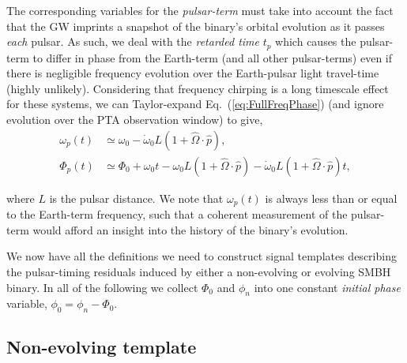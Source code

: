 \documentclass[twocolappendix,tighten]{emulateapj}
\begin{document}
The corresponding variables for the {\it pulsar-term} must take into account the fact that the GW imprints a snapshot of the binary's orbital evolution as it passes {\it each} pulsar. As such, we deal with the {\it retarded time} $t_p$ which causes the pulsar-term to differ in phase from the Earth-term (and all other pulsar-terms) even if there is negligible frequency evolution over the Earth-pulsar light travel-time (highly unlikely). Considering that frequency chirping is a long timescale effect for these systems, we can Taylor-expand Eq.\ (\ref{eq:FullFreqPhase}) (and ignore evolution over the PTA observation window) to give,
\begin{align}
\omega_p(t) &\simeq \omega_0 - \dot\omega_0L(1+\hat\Omega\cdot\hat{p}),\nonumber\\
\Phi_p(t) &\simeq \Phi_0 + \omega_0t - \omega_0L(1+\hat\Omega\cdot\hat{p}) - \dot\omega_0L(1+\hat\Omega\cdot\hat{p})t,
\end{align}

where $L$ is the pulsar distance. We note that $\omega_p(t)$ is always less than or equal to the Earth-term frequency, such that a coherent measurement of the pulsar-term would afford an insight into the history of the binary's evolution.

We now have all the definitions we need to construct signal templates describing the pulsar-timing residuals induced by either a non-evolving or evolving SMBH binary. In all of the following we collect $\Phi_0$ and $\phi_n$ into one constant {\it initial phase} variable, $\phi_0 = \phi_n - \Phi_0$. 



\subsection{Non-evolving template} \label{sec:NonEvolveTemplate}
\end{document}
